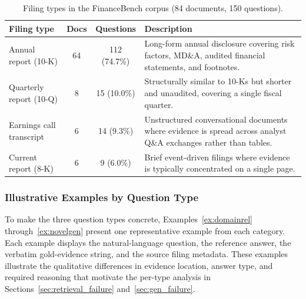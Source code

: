\documentclass[12pt,twoside,maitrise]{dms}
\newcounter{example}
\theoremstyle{definition}
\numberwithin{equation}{section}
\numberwithin{table}{chapter}
\numberwithin{figure}{chapter}
\begin{document}
\begin{table}[ht]
  \centering
  \small
  \caption{Filing types in the FinanceBench corpus (84 documents, 150 questions).}
  \label{tab:filing_types}
  \begin{tabularx}{\linewidth}{@{}l c c X@{}}
    \toprule
    \textbf{Filing type} & \textbf{Docs} & \textbf{Questions} & \textbf{Description} \\
    \midrule
    Annual report (10-K)
      & 64 & 112 (74.7\%)
      & Long-form annual disclosure covering risk factors, MD\&A, audited
        financial statements, and footnotes. \\[4pt]
    Quarterly report (10-Q)
      & 8 & 15 (10.0\%)
      & Structurally similar to 10-Ks but shorter and unaudited, covering a
        single fiscal quarter. \\[4pt]
    Earnings call transcript
      & 6 & 14 (9.3\%)
      & Unstructured conversational documents where evidence is spread across
        analyst Q\&A exchanges rather than tables. \\[4pt]
    Current report (8-K)
      & 6 & 9 (6.0\%)
      & Brief event-driven filings where evidence is typically concentrated
        on a single page. \\
    \bottomrule
  \end{tabularx}
\end{table}

\subsubsection{Illustrative Examples by Question Type}
\label{sec:financebench_examples}

To make the three question types concrete, Examples~\ref{ex:domainrel}
through~\ref{ex:novelgen} present one representative example from each category.
Each example displays the natural-language question, the reference answer, the verbatim
gold-evidence string, and the source filing metadata. These examples illustrate the
qualitative differences in evidence location, answer type, and required reasoning that
motivate the per-type analysis in Sections~\ref{sec:retrieval_failure}
and~\ref{sec:gen_failure}.


\end{document}
